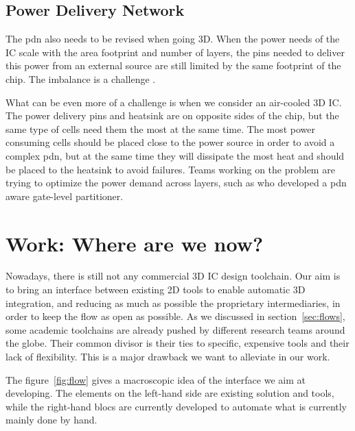 \documentclass[11pt,a4paper]{report} %
\theoremstyle{customdef}
\begin{document}
\section{Power Delivery Network}
The \gls{pdn} also needs to be revised when going 3D.
When the power needs of the IC scale with the area footprint and number of layers, the pins needed to deliver this power from an external source are still limited by the same footprint of the chip.
The imbalance is a challenge \citep{Jain2008}.

What can be even more of a challenge is when we consider an air-cooled 3D IC.
The power delivery pins and heatsink are on opposite sides of the chip, but the same type of cells need them the most at the same time.
The most power consuming cells should be placed close to the power source in order to avoid a complex \gls{pdn}, but at the same time they will dissipate the most heat and should be placed to the heatsink to avoid failures.
Teams working on the problem are trying to optimize the power demand across layers, such as \citet{Pantht2015} who developed a \gls{pdn} aware gate-level  partitioner.




\chapter{Work: Where are we now?}\label{sec:work}\label{chap:work}
Nowadays, there is still not any commercial 3D IC design toolchain.
Our aim is to bring an interface between existing 2D tools to enable automatic 3D integration, and reducing as much as possible the proprietary intermediaries, in order to keep the flow as open as possible.
As we discussed in section~\ref{sec:flows}, some academic toolchains are already pushed by different research teams around the globe.
Their common divisor is their ties to specific, expensive tools and their lack of flexibility.
This is a major drawback we want to alleviate in our work.

The figure~\ref{fig:flow} gives a macroscopic idea of the interface we aim at developing.
The elements on the left-hand side are existing solution and tools, while the right-hand blocs are currently developed to automate what is currently mainly done by hand.
\end{document}
